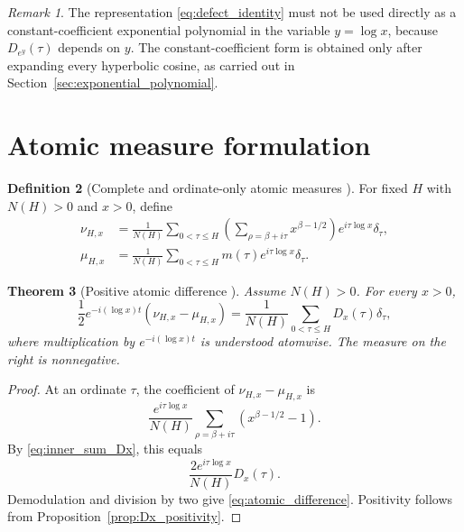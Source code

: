 \documentclass[11pt]{amsart}
\numberwithin{equation}{section}
\theoremstyle{plain}
\newtheorem{theorem}{Theorem}[section]
\theoremstyle{definition}
\newtheorem{definition}[theorem]{Definition}
\theoremstyle{remark}
\newtheorem{remark}[theorem]{Remark}
\begin{document}
\begin{remark}
\label{rem:not_constant_coefficients_yet}
The representation \eqref{eq:defect_identity} must not be used directly as a constant-coefficient exponential polynomial in the variable $y=\log x$, because $D_{e^y}(\tau)$ depends on $y$.  The constant-coefficient form is obtained only after expanding every hyperbolic cosine, as carried out in Section~\ref{sec:exponential_polynomial}.
\end{remark}

\section{Atomic measure formulation}
\label{sec:atomic_measures}

\begin{definition}[Complete and ordinate-only atomic measures {}]
\label{def:atomic_measures}
For fixed $H$ with $N(H)>0$ and $x>0$, define
\begin{align}
\nu_{H,x}
&=
\frac{1}{N(H)}
\sum_{0<\tau\leq H}
\left(
\sum_{\rho=\beta+i\tau}x^{\beta-1/2}
\right)
e^{i\tau\log x}\delta_\tau,
\label{eq:nu_measure}
\\
\mu_{H,x}
&=
\frac{1}{N(H)}
\sum_{0<\tau\leq H}
m(\tau)e^{i\tau\log x}\delta_\tau.
\label{eq:mu_measure}
\end{align}
\end{definition}

\begin{theorem}[Positive atomic difference {}]
\label{thm:atomic_difference}
Assume $N(H)>0$.
For every $x>0$,
\begin{equation}
\boxed{
\frac12e^{-i(\log x)t}
\left(\nu_{H,x}-\mu_{H,x}\right)
=
\frac{1}{N(H)}
\sum_{0<\tau\leq H}D_x(\tau)\delta_\tau,
}
\label{eq:atomic_difference}
\end{equation}
where multiplication by $e^{-i(\log x)t}$ is understood atomwise.  The measure on the right is nonnegative.
\end{theorem}

\begin{proof}
At an ordinate $\tau$, the coefficient of $\nu_{H,x}-\mu_{H,x}$ is
\begin{equation}
\frac{e^{i\tau\log x}}{N(H)}
\sum_{\rho=\beta+i\tau}
\left(x^{\beta-1/2}-1\right).
\label{eq:atomic_coefficient_difference}
\end{equation}
By \eqref{eq:inner_sum_Dx}, this equals
\begin{equation}
\frac{2e^{i\tau\log x}}{N(H)}D_x(\tau).
\label{eq:atomic_coefficient_Dx}
\end{equation}
Demodulation and division by two give \eqref{eq:atomic_difference}.  Positivity follows from Proposition~\ref{prop:Dx_positivity}.
\end{proof}
\end{document}

